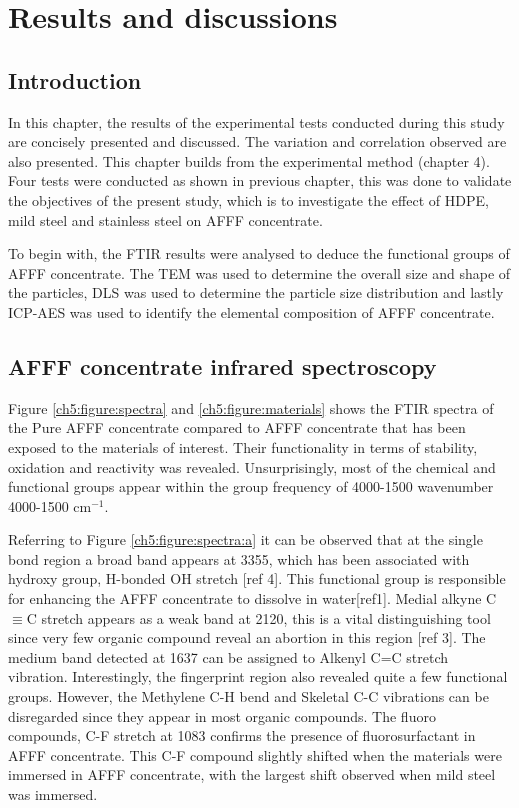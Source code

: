 \chapter{Results and discussions}
\section{Introduction}
In this chapter, the results of the experimental tests conducted during this study are concisely presented and discussed. The variation and correlation observed are also presented. This chapter builds from the experimental method (chapter 4).  Four tests were conducted as shown in previous chapter, this was done to validate the objectives of the present study, which is to investigate the effect of HDPE, mild steel and stainless steel on AFFF concentrate. 

To begin with, the FTIR results were analysed to deduce the functional groups of AFFF concentrate. The TEM was used to determine the overall size and shape of the particles, DLS was used to determine the particle size distribution and lastly ICP-AES was used to identify the elemental composition of AFFF concentrate.  

\section{AFFF concentrate infrared spectroscopy}
Figure \ref{ch5:figure:spectra} and \ref{ch5:figure:materials} shows the FTIR spectra of the Pure AFFF concentrate compared to AFFF concentrate that has been exposed to the materials of interest.  Their functionality in terms of stability, oxidation and reactivity was revealed. Unsurprisingly, most of the chemical and functional groups appear within the group frequency of 4000-1500 wavenumber 4000-1500 cm$^{-1}$.

Referring to Figure \ref{ch5:figure:spectra:a} it can be observed that at the single bond region a broad band appears at 3355, which has been associated with hydroxy group, H-bonded OH stretch [ref 4]. This functional group is responsible for enhancing the AFFF concentrate to dissolve in water[ref1].  Medial alkyne C$\equiv$C stretch appears as a weak band at 2120, this is a vital distinguishing tool since very few organic compound reveal an abortion in this region [ref 3]. The medium band detected at 1637 can be assigned to Alkenyl C=C stretch vibration. Interestingly, the fingerprint region also revealed quite a few functional groups. However, the Methylene C-H bend and Skeletal C-C vibrations can be disregarded since they appear in most organic compounds. The fluoro compounds, C-F stretch at 1083 confirms the presence of fluorosurfactant in AFFF concentrate. This C-F compound slightly shifted when the materials were immersed in AFFF concentrate, with the largest shift observed when mild steel was immersed.

